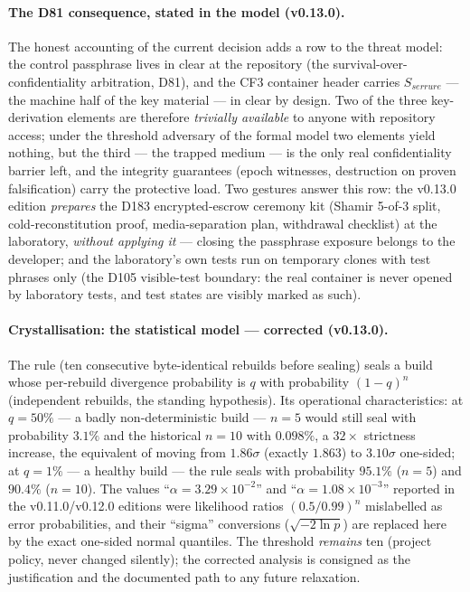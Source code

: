 \documentclass[11pt,a4paper]{article}
\begin{document}
\paragraph{The D81 consequence, stated in the model (v0.13.0).} The
honest accounting of the current decision adds a row to the threat
model: the control passphrase lives in clear at the repository (the
survival-over-confidentiality arbitration, D81), and the CF3 container
header carries $S_{serrure}$ --- the machine half of the key material ---
in clear by design. Two of the three key-derivation elements are
therefore \emph{trivially available} to anyone with repository access;
under the threshold adversary of the formal model two elements yield
nothing, but the third --- the trapped medium --- is the only real
confidentiality barrier left, and the integrity guarantees (epoch
witnesses, destruction on proven falsification) carry the protective
load. Two gestures answer this row: the v0.13.0 edition \emph{prepares}
the D183 encrypted-escrow ceremony kit (Shamir 5-of-3 split,
cold-reconstitution proof, media-separation plan, withdrawal checklist)
at the laboratory, \emph{without applying it} --- closing the passphrase
exposure belongs to the developer; and the laboratory's own tests run on
temporary clones with test phrases only (the D105 visible-test boundary:
the real container is never opened by laboratory tests, and test states
are visibly marked as such).

\paragraph{Crystallisation: the statistical model --- corrected (v0.13.0).}
The rule (ten consecutive byte-identical rebuilds before sealing) seals
a build whose per-rebuild divergence probability is $q$ with probability
$(1-q)^n$ (independent rebuilds, the standing hypothesis). Its
operational characteristics: at $q = 50\%$ --- a badly
non-deterministic build --- $n = 5$ would still seal with probability
$3.1\%$ and the historical $n = 10$ with $0.098\%$, a $32\times$
strictness increase, the equivalent of moving from $1.86\sigma$
(exactly $1.863$) to
$3.10\sigma$ one-sided; at $q = 1\%$ --- a healthy build --- the rule
seals with probability $95.1\%$ ($n{=}5$) and $90.4\%$ ($n{=}10$). The
values ``$\alpha = 3.29\times10^{-2}$'' and ``$\alpha = 1.08\times
10^{-3}$'' reported in the v0.11.0/v0.12.0 editions were likelihood
ratios $(0.5/0.99)^n$ mislabelled as error probabilities, and their
``sigma'' conversions ($\sqrt{-2\ln p}$) are replaced here by the exact
one-sided normal quantiles. The threshold \emph{remains} ten (project
policy, never changed silently); the corrected analysis is consigned as
the justification and the documented path to any future relaxation.
\end{document}

